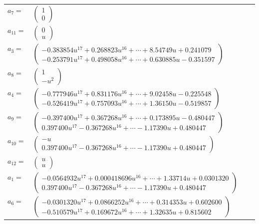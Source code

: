 \documentclass[1p]{elsarticle_modified}
\theoremstyle{definition}
\begin{document}
\begin{tabular}{m{7pt} m{180pt} m{7pt} m{180pt} }
\flushright $a_{7}=$&$\begin{pmatrix}1\\0\end{pmatrix}$ \\
\flushright $a_{11}=$&$\begin{pmatrix}0\\u\end{pmatrix}$ \\
\flushright $a_{3}=$&$\begin{pmatrix}-0.383854 u^{17}+0.268823 u^{16}+\cdots+8.54749 u+0.241079\\-0.253791 u^{17}+0.498058 u^{16}+\cdots+0.630885 u-0.351597\end{pmatrix}$ \\
\flushright $a_{8}=$&$\begin{pmatrix}1\\- u^2\end{pmatrix}$ \\
\flushright $a_{4}=$&$\begin{pmatrix}-0.777946 u^{17}+0.831176 u^{16}+\cdots+9.02458 u-0.225548\\-0.526419 u^{17}+0.757093 u^{16}+\cdots+1.36150 u-0.519857\end{pmatrix}$ \\
\flushright $a_{9}=$&$\begin{pmatrix}-0.397400 u^{17}+0.367268 u^{16}+\cdots+0.173895 u-0.480447\\0.397400 u^{17}-0.367268 u^{16}+\cdots-1.17390 u+0.480447\end{pmatrix}$ \\
\flushright $a_{10}=$&$\begin{pmatrix}- u\\0.397400 u^{17}-0.367268 u^{16}+\cdots-1.17390 u+0.480447\end{pmatrix}$ \\
\flushright $a_{12}=$&$\begin{pmatrix}u\\u\end{pmatrix}$ \\
\flushright $a_{1}=$&$\begin{pmatrix}-0.0564932 u^{17}+0.000418696 u^{16}+\cdots+1.33714 u+0.0301320\\0.397400 u^{17}-0.367268 u^{16}+\cdots-1.17390 u+0.480447\end{pmatrix}$ \\
\flushright $a_{6}=$&$\begin{pmatrix}-0.0301320 u^{17}+0.0866252 u^{16}+\cdots+0.314353 u+0.602600\\-0.510579 u^{17}+0.169672 u^{16}+\cdots+1.32635 u+0.815602\end{pmatrix}$ \\

\end{tabular}
\end{document}
